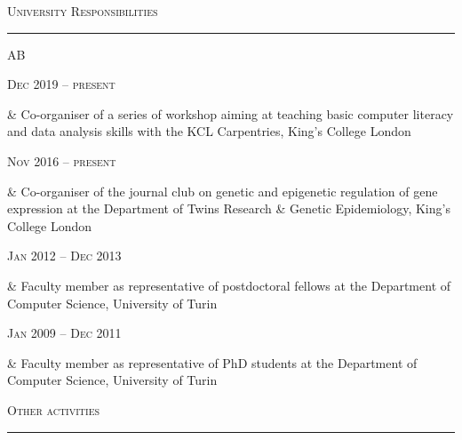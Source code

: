 \documentclass[a4paper,10pt]{article}
\newcommand{\mediumtitle}[1]{
	\vspace{0.2cm}
	{\noindent
	\Large \textsc{#1}\\[-2ex]
	\hrule
	\vspace{0.2cm}}
}
\newenvironment{doubletablelist}
{
	\vspace{-0.2cm}
	\begin{longtable}[!h]{AB}}{\end{longtable}
}
\newcommand{\dtlist}[2]{
\hspace{-3cm}
\noindent
	\begin{minipage}{0.22\textwidth}
	\begin{flushright}
	\textsc{#1}
	\end{flushright}
	\end{minipage}
	& #2\\[0.2cm]
}
\begin{document}

\mediumtitle{University Responsibilities}

\begin{doubletablelist}

	\dtlist{Dec 2019 -- present}{Co-organiser of a series of workshop aiming at teaching basic computer literacy and data analysis skills with the KCL Carpentries, King's College London}
	\dtlist{Nov 2016 -- present}{Co-organiser of the journal club on genetic and epigenetic regulation of gene expression at the Department of Twins Research \& Genetic Epidemiology, King's College London}
	\dtlist{Jan 2012 -- Dec 2013}{Faculty member as representative of postdoctoral fellows at the Department of Computer Science, University of Turin}
	\dtlist{Jan 2009 -- Dec 2011}{Faculty member as representative of PhD students at the Department of Computer Science, University of Turin}
	
\end{doubletablelist}



\mediumtitle{Other activities}
\end{document}

